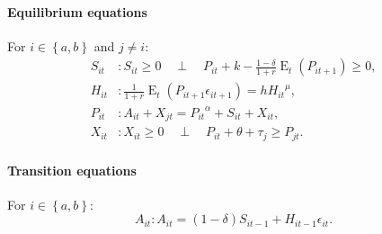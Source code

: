 \documentclass[11pt,fleqn]{article}
\DeclareMathOperator{\E}{E}
\newcommand{\CP}{\quad \perp \quad}
\begin{document}
\paragraph{Equilibrium equations}
\label{sec:equil-equat}

For $i \in \left\{a,b\right\}$ and $j \ne i$:
\begin{align}
  S_{it}&: S_{it}\ge 0 \CP P_{it}+k-\frac{1-\delta}{1+r}\E_{t}\left(P_{it+1}\right)\ge 0,\\
  H_{it}&: \frac{1}{1+r}\E_{t}\left(P_{it+1}\epsilon_{it+1}\right)=h {H_{it}}^{\mu},\\
  P_{it}&: A_{it}+X_{jt}={P_{it}}^{\alpha}+S_{it}+X_{it},\\
  X_{it}&: X_{it}\ge 0 \CP P_{it}+\theta+\tau_{j}\ge P_{jt}.
\end{align}

\paragraph{Transition equations}
\label{sec:transition-equation}

For $i \in \left\{a,b\right\}$:
\begin{equation}
  A_{it}: A_{it}=\left(1-\delta\right)S_{it-1}+H_{it-1}\epsilon_{it}.
\end{equation}

%
\end{document}
